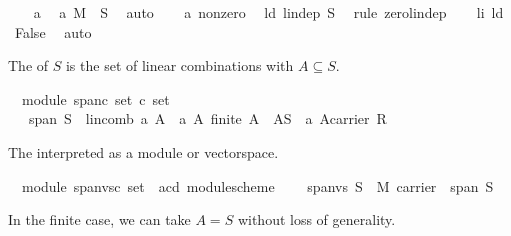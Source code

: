 \begin{isabellebody}
\ \ \isamarkupfalse%
\ a{}\ \isamarkupfalse%
\ a{}{\isacharcolon}\ {\isachardoublequoteopen}{\isasymzero}\isactrlbsub M\isactrlesub \ {\isasymin}\ S{\isachardoublequoteclose}\ \isamarkupfalse%
\ auto\isanewline
\ \ \isamarkupfalse%
\ a{}\ nonzero\ \isamarkupfalse%
\ ld{\isacharcolon}\ {\isachardoublequoteopen}lin{\isacharunderscore}dep\ S{\isachardoublequoteclose}\ \isamarkupfalse%
\ {\isacharparenleft}rule\ zero{\isacharunderscore}lin{\isacharunderscore}dep{\isacharparenright}\isanewline
\ \ \isamarkupfalse%
\ li\ ld\ \isamarkupfalse%
\ False\ \isamarkupfalse%
\ auto\isanewline
{}\isamarkupfalse%
%
\endisatagproof
{\isafoldproof}%
%
\isadelimproof
%
\endisadelimproof
%
\begin{isamarkuptext}%
The  of $S$ is the set of linear combinations with $A \subseteq S$.%
\end{isamarkuptext}%
\isamarkuptrue%
\isamarkupfalse%
\ {\isacharparenleft}\ module{\isacharparenright}\ span{\isacharcolon}{\isacharcolon}{\isachardoublequoteopen}{\isacharprime}c\ set\ {\isasymRightarrow}{\isacharprime}c\ set{\isachardoublequoteclose}\ \isanewline
\ \ \ {\isachardoublequoteopen}span\ S\ {\isacharequal}\ {\isacharbraceleft}lincomb\ a\ A\ {\isacharbar}\ a\ A{\isachardot}\ finite\ A\ {\isasymand}\ A{\isasymsubseteq}S\ {\isasymand}\ a{\isasymin}\ {\isacharparenleft}A{\isasymrightarrow}carrier\ R{\isacharparenright}{\isacharbraceright}{\isachardoublequoteclose}%
\begin{isamarkuptext}%
The  interpreted as a module or vectorspace.%
\end{isamarkuptext}%
\isamarkuptrue%
\isamarkupfalse%
\ {\isacharparenleft}\ module{\isacharparenright}\ span{\isacharunderscore}vs{\isacharcolon}{\isacharcolon}{\isachardoublequoteopen}{\isacharprime}c\ set\ {\isasymRightarrow}\ {\isacharparenleft}{\isacharprime}a{\isacharcomma}{\isacharprime}c{\isacharcomma}{\isacharprime}d{\isacharparenright}\ module{\isacharunderscore}scheme{\isachardoublequoteclose}\ \isanewline
\ \ \ {\isachardoublequoteopen}span{\isacharunderscore}vs\ S\ {\isasymequiv}\ M\ {\isasymlparr}carrier\ {\isacharcolon}{\isacharequal}\ span\ S{\isasymrparr}{\isachardoublequoteclose}%
\begin{isamarkuptext}%
In the finite case, we can take $A=S$ without loss of generality.%

\end{isamarkuptext}
\end{isabellebody}
